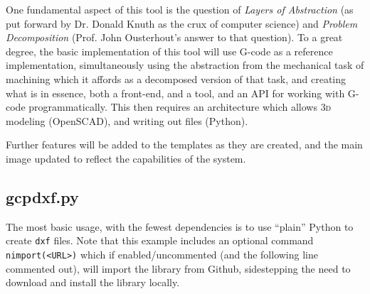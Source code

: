 \documentclass{ltxdoc}
\begin{document}
One fundamental aspect of this tool is the question of \emph{Layers of Abstraction} (as put forward by Dr. Donald Knuth as the crux of computer science) and \emph{Problem Decomposition} (Prof. John Ousterhout's answer to that question). To a great degree, the basic implementation of this tool will use G-code as a reference implementation, simultaneously using the abstraction from the mechanical task of machining which it affords as a decomposed version of that task, and creating what is in essence, both a front-end, and a tool, and an API for working with G-code programmatically. This then requires an architecture which allows \textsc{3d} modeling (OpenSCAD), and writing out files (Python).

Further features will be added to the templates as they are created, and the main image updated to reflect the capabilities of the system.

%
%
%
%
%

\subsection{gcpdxf.py}

The most basic usage, with the fewest dependencies is to use ``plain'' Python to create \verb|dxf| files. Note that this example includes an optional command \verb|nimport(<URL>)| which if enabled/uncommented (and the following line commented out), will import the library from Github, sidestepping the need to download and install the library locally.
\end{document}

